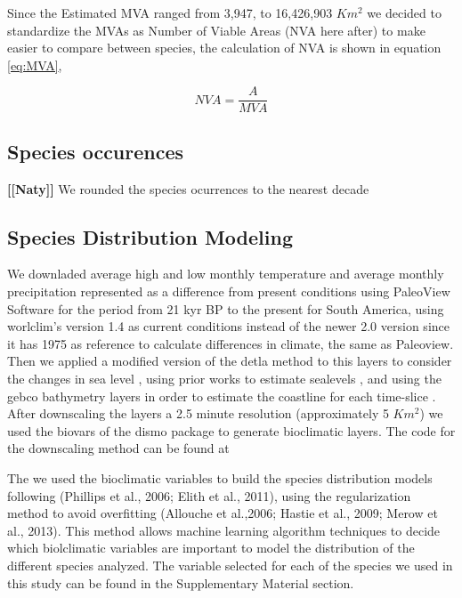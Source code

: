 \documentclass[]{article}
\begin{document}
Since the Estimated MVA ranged from 3,947, to 16,426,903 \(Km^2\) we decided to standardize the MVAs as Number of Viable Areas (NVA here after) to make easier to compare between species, the calculation of NVA is shown in equation \eqref{eq:MVA},

\begin{equation}
  NVA = \frac{A}{MVA}
  \label{eq:NVA}
\end{equation}

\hypertarget{species-occurences}{%
\subsection{Species occurences}\label{species-occurences}}

\textbf{{[}{[}Naty{]}{]}}
We rounded the species ocurrences to the nearest decade

\hypertarget{species-distribution-modeling}{%
\subsection{Species Distribution Modeling}\label{species-distribution-modeling}}

We downladed average high and low monthly temperature and average monthly precipitation represented as a difference from present conditions using PaleoView Software \citep{fordham2017paleoview} for the period from 21 kyr BP to the present for South America, using worlclim's version 1.4 as current conditions \citep{hijmans2005very} instead of the newer 2.0 version \citep{fick2017worldclim} since it has 1975 as reference to calculate differences in climate, the same as Paleoview. Then we applied a modified version of the detla method to this layers to consider the changes in sea level \citep{schmatz2015gridded}, using prior works to estimate sealevels \citep[\citet{milne2005modelling}]{fleming1998refining}, and using the gebco bathymetry layers in order to estimate the coastline for each time-slice \citep{weatherall2015new}. After downscaling the layers a 2.5 minute resolution (approximately 5 \(Km^2\)) we used the biovars of the dismo package \citep{Hijman_dismo} to generate bioclimatic layers. The code for the downscaling method can be found at \citep{derek_corcoran_barrios_2020_4016075}

The we used the bioclimatic variables to build the species distribution models following (Phillips et al., 2006; Elith et al., 2011), using the regularization method to avoid overfitting (Allouche et al.,2006; Hastie et al., 2009; Merow et al., 2013). This method allows machine learning algorithm techniques to decide which biolclimatic variables are important to model the distribution of the different species analyzed. The variable selected for each of the species we used in this study can be found in the Supplementary Material section.
\end{document}
